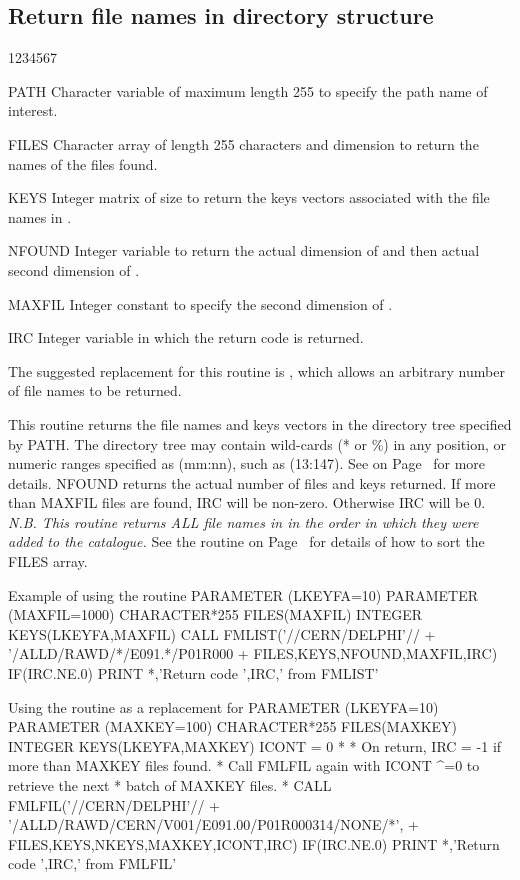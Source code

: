 \subsection{Return file names in directory structure}
\begin{DLtt}{1234567}
\item[PATH]
Character variable of maximum length 255 to specify the path name of
interest.
\item[FILES]
Character array of length 255 characters and dimension 
to return the names of the files found.
\item[KEYS]
Integer matrix of size  to return the keys
vectors associated with the file names in .
\item[NFOUND]
Integer variable to return the actual dimension of  and
then actual second dimension of .
\item[MAXFIL]
Integer constant to specify the second dimension of .
\item[IRC]
Integer variable in which the return code is returned.
\end{DLtt}
\par
The suggested replacement for this routine is , which 
allows an arbitrary number of file names to be returned.
\par
This routine returns the file names and keys vectors
in the directory tree specified by PATH.
The directory tree may contain wild-cards (* or \%) in any position,
or numeric ranges specified as (mm:nn), such as (13:147).
See on Page~\pageref{FMATCH} for more details.
NFOUND returns the actual number of files and keys returned.
If more than MAXFIL files are found, IRC will be non-zero.
Otherwise IRC will be 0.
{\it N.B. This routine returns ALL file names in
in the order in which they were added to the catalogue.}
See the routine on Page~\pageref{FMSORT} for details of how to
sort the FILES array.
\begin{XMPt}{Example of using the \protect{} routine}
      PARAMETER     (LKEYFA=10)
      PARAMETER     (MAXFIL=1000)
      CHARACTER*255 FILES(MAXFIL)
      INTEGER       KEYS(LKEYFA,MAXFIL)
      CALL FMLIST('//CERN/DELPHI'//
     +            '/ALLD/RAWD/*/E091.*/P01R000%
     +            FILES,KEYS,NFOUND,MAXFIL,IRC)
      IF(IRC.NE.0) PRINT *,'Return code ',IRC,' from FMLIST'
\end{XMPt}
\begin{XMPt}{Using the \protect{} routine as a replacement for \protect{}}
      PARAMETER     (LKEYFA=10)
      PARAMETER     (MAXKEY=100)
      CHARACTER*255  FILES(MAXKEY)
      INTEGER        KEYS(LKEYFA,MAXKEY)
      ICONT = 0
*
*     On return, IRC = -1 if more than MAXKEY files found.
*     Call FMLFIL again with ICONT ^=0 to retrieve the next
*     batch of MAXKEY files.
* 
      CALL FMLFIL('//CERN/DELPHI'//
     +            '/ALLD/RAWD/CERN/V001/E091.00/P01R000314/NONE/*',
     +            FILES,KEYS,NKEYS,MAXKEY,ICONT,IRC)
      IF(IRC.NE.0) PRINT *,'Return code ',IRC,' from FMLFIL'
\end{XMPt}
